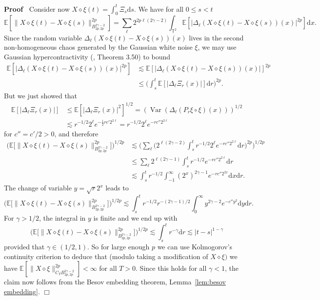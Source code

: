 \documentclass[a4paper,11pt]{article}
\newcommand{\mathd}{\mathrm{d}}
\newcommand{\tmop}[1]{\ensuremath{\operatorname{#1}}}
\newenvironment{proof}{\noindent\textbf{Proof\ }}{\hspace*{\fill}$\Box$\medskip}
\newcommand{\reso}{\,\mathord{\circ}\,}
\newcommand{\renorm}{\,\mathord{\diamond}\,}
\begin{document}
\begin{proof}
  Consider now $X \renorm \xi (t) = \int_0^t \Xi_s \mathd s$. We have for all
  $0 \leqslant s < t$
  \[ \mathbb{E} [\| X \renorm \xi (t) - X \renorm \xi (s) \|_{B^{2 \gamma -
     2}_{2 p, 2 p}}^{2 p}] = \sum_{\ell} 2^{2 p \ell (2 \gamma - 2)}
     \int_{\mathbb{T}^2} \mathbb{E} [| \Delta_{\ell} (X \renorm \xi (t) - X
     \renorm \xi (s)) (x) |^{2 p}] \mathd x. \]
  Since the random variable $\Delta_{\ell} (X \renorm \xi (t) - X \renorm \xi (s))
  (x)$ lives in the second non-homogeneous chaos generated by the Gaussian white noise $\xi$, we may use Gaussian hypercontractivity ({\cite{Janson1997}}, Theorem 3.50) to bound
  \begin{align*}
     \mathbb{E} [| \Delta_{\ell} (X \renorm \xi (t) - X \renorm \xi (s)) (x) |^{2 p}] & \lesssim \mathbb{E} [| \Delta_{\ell} (X \renorm \xi (t) - X \renorm \xi (s)) (x) |]^{2 p} \\
     & \leqslant \Big( \int_s^t \mathbb{E} [| \Delta_{\ell} \Xi_r (x) |] \mathd r \Big)^{2 p}.
  \end{align*}
  But we just showed that
  \begin{align*}
     \mathbb{E} [| \Delta_{\ell} \Xi_r (x) |] & \leqslant \mathbb{E} [| \Delta_{\ell} \Xi_r (x) |^2]^{1 / 2} = (\tmop{Var} (\Delta_{\ell} (P_r \xi \reso \xi) (x)))^{1 / 2} \\
     & \lesssim r^{- 1 / 2} 2^{\ell} e^{- \frac{1}{2} r c' 2^{2 \ell}} = r^{- 1 / 2} 2^{\ell} e^{- r c'' 2^{2 \ell}}
  \end{align*}
  for $c'' = c'/2 > 0$, and therefore
  \begin{align*}
    \Big(\mathbb{E} \Big[\| X \renorm \xi (t) - X \renorm \xi (s) \|_{B^{2 \gamma - 2}_{2 p, 2 p}}^{2 p}\Big]\Big)^{1 / 2 p} & \lesssim \Big( \sum_{\ell} \Big( 2^{\ell (2 \gamma - 2)} \int_s^t r^{- 1 / 2} 2^{\ell} e^{- r c'' 2^{2 \ell}} \mathd r \Big)^{2 p} \Big)^{1 / 2 p} \\
    & \leqslant \sum_{\ell} 2^{\ell (2 \gamma - 1)} \int_s^t r^{- 1 / 2} e^{-
    r c'' 2^{2 \ell}} \mathd r \\
    & \lesssim \int_s^t r^{- 1 / 2} \int_{- 1}^{\infty} (2^x)^{2  \gamma - 1} e^{- r c'' 2^{2 x}} \mathd x \mathd r.
  \end{align*}
  The change of variable $y = \sqrt{r} 2^x$ leads to
  \[
     \Big(\mathbb{E} \Big[\| X \renorm \xi (t) - X \renorm \xi (s) \|_{B^{2 \gamma - 2}_{2 p, 2 p}}^{2 p}\Big]\Big)^{1 / 2 p} \lesssim \int_s^t r^{- 1 / 2} r^{- (2 \gamma - 1) / 2}  \int_0^{\infty} y^{2 \gamma - 2} e^{- c'' y^2} \mathd y \mathd r.
  \]
  For $\gamma > 1 / 2$, the integral in $y$ is finite and we end up with
  \[
     \Big(\mathbb{E} \Big[\| X \renorm \xi (t) - X \renorm \xi (s) \|_{B^{2 \gamma - 2}_{2 p, 2 p}}^{2 p}\Big]\Big)^{1 / 2 p} \lesssim \int_s^t r^{- \gamma} \mathd r \lesssim | t - s |^{1 - \gamma}
  \]
  provided that $\gamma \in (1 / 2, 1)$. So for large enough $p$ we can use
  Kolmogorov's continuity criterion to deduce that (modulo taking a modification of $X\diamond \xi)$ we have $\mathbb{E} [\| X \renorm
  \xi \|_{C_T B^{2 \gamma - 2}_{2 p, 2 p}}^{2 p}] < \infty$ for all $T > 0$. Since this holds for all $\gamma < 1$, the claim now follows from the Besov embedding theorem, Lemma~\ref{lem:besov embedding}.
\end{proof}
\end{document}
